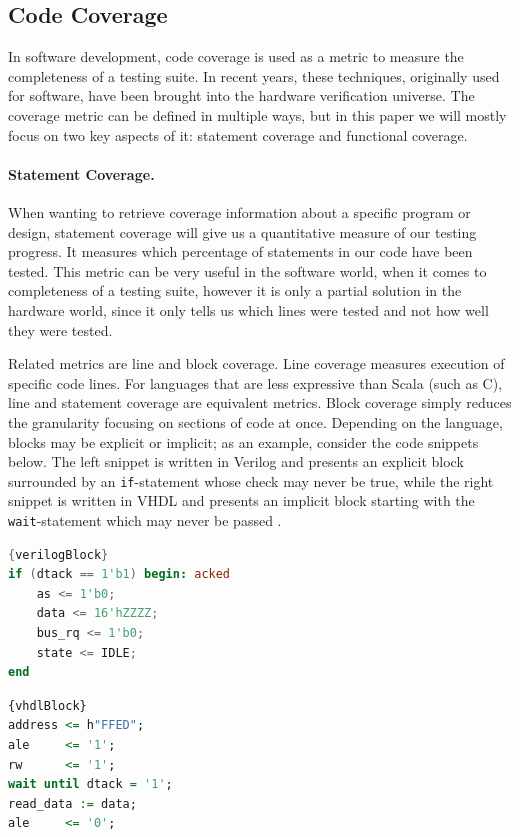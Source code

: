 \documentclass[conference]{IEEEtran}
\begin{document}
\subsection{Code Coverage}
In software development, code coverage is used as a metric to measure the completeness of a testing suite. In recent years, these techniques, originally used for software, have been brought into the hardware verification universe. The coverage metric can be defined in multiple ways, but in this paper we will mostly focus on two key aspects of it: statement coverage and functional coverage. 

\paragraph{Statement Coverage.} When wanting to retrieve coverage information about a specific program or design, statement coverage will give us a quantitative measure of our testing progress. It measures which percentage of statements in our code have been tested. This metric can be very useful in the software world, when it comes to completeness of a testing suite, however it is only a partial solution in the hardware world, since it only tells us which lines were tested and not how well they were tested.

Related metrics are line and block coverage. Line coverage measures execution of specific code lines. For languages that are less expressive than Scala (such as C), line and statement coverage are equivalent metrics. Block coverage simply reduces the granularity focusing on sections of code at once. Depending on the language, blocks may be explicit or implicit; as an example, consider the code snippets below. The left snippet is written in Verilog and presents an explicit block surrounded by an \texttt{if}-statement whose check may never be true, while the right snippet is written in VHDL and presents an implicit block starting with the \texttt{wait}-statement which may never be passed \cite{hdlverify}.

\noindent\begin{minipage}{.45\textwidth}
\begin{lstlisting}[language=verilog]{verilogBlock}
if (dtack == 1'b1) begin: acked
    as <= 1'b0;
    data <= 16'hZZZZ;
    bus_rq <= 1'b0;
    state <= IDLE;
end
\end{lstlisting}
\end{minipage}\hfill
\begin{minipage}{.45\textwidth}
\begin{lstlisting}[language=vhdl, firstnumber=1]{vhdlBlock}
address <= h"FFED";
ale     <= '1';
rw      <= '1';
wait until dtack = '1';
read_data := data;
ale     <= '0';
\end{lstlisting}
\end{minipage}
\end{document}
